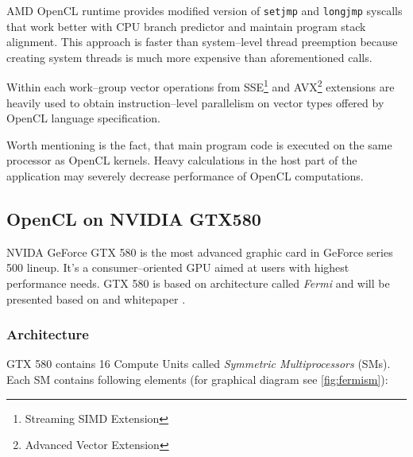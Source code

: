 AMD OpenCL
runtime provides modified version of \texttt{setjmp} and \texttt{longjmp} syscalls
that work better with CPU branch predictor and maintain program stack alignment.
This approach is faster than system--level thread preemption because creating
system threads is much more expensive than aforementioned calls.

Within each work--group vector operations from SSE\footnote{Streaming SIMD
Extension} and AVX\footnote{Advanced Vector Extension} extensions are heavily
used to obtain instruction--level parallelism on vector types offered by OpenCL
language specification.

Worth mentioning is the fact, that main program code is executed on the same
processor as OpenCL kernels. Heavy calculations in the host part of the application
may severely decrease performance of OpenCL computations.

\subsection{OpenCL on NVIDIA GTX580}

NVIDA GeForce GTX 580 is the most advanced graphic card in GeForce series 500 lineup.
It's a consumer--oriented GPU aimed at users with highest performance needs.
GTX 580 is based on architecture called \emph{Fermi} and will be presented based on
\cite[pp. 59--61]{gaster2012heterogeneous} and whitepaper \cite{nvidiafermi}.

\subsubsection{Architecture}
GTX 580 contains 16 Compute Units called \emph{Symmetric Multiprocessors} (SMs).
Each SM contains following elements (for graphical diagram see
\autoref{fig:fermism}):

